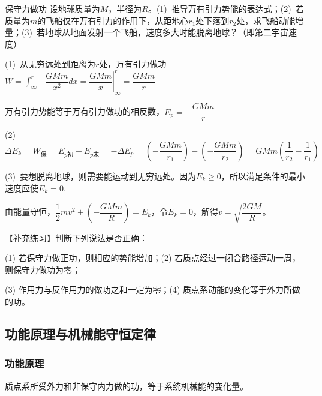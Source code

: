 \begin{example}{保守力做功}
    设地球质量为$M$，半径为$R$。(1)~推导万有引力势能的表达式；(2)~若质量为$m$的飞船仅在万有引力的作用下，从距地心$r_1$处下落到$r_2$处，求飞船动能增量；(3)~若地球从地面发射一个飞船，速度多大时能脱离地球？（即第二宇宙速度）
    
    \tcblower

    (1)~从无穷远处到距离为$r$处，万有引力做功$W=\displaystyle\int_\infty^r{-\dfrac{GMm}{x^2}dx}=\left.\dfrac{GMm}{x}\right|_\infty^r=\dfrac{GMm}{r}$

    \vspace{0.35em}

    万有引力势能等于万有引力做功的相反数，$E_p=-\dfrac{GMm}{r}$

    \vspace{0.35em}
    
    (2)~$\Delta E_k=W_{\text{保}}=E_{p\text{初}}-E_{p\text{末}}=-\Delta E_p=\left(-\dfrac{GMm}{r_1}\right)-\left(-\dfrac{GMm}{r_2}\right)=GMm\left(\dfrac{1}{r_2}-\dfrac{1}{r_1}\right)$

    \vspace{0.35em}

    (3)~要想脱离地球，则需要能运动到无穷远处。因为$E_k\geq 0$，所以满足条件的最小速度应使$E_k=0$.

    \vspace{0.35em}
    
    由能量守恒，$\dfrac{1}{2}mv^2+\left(-\dfrac{GMm}{R}\right)=E_k$，令$E_k=0$，解得$v=\sqrt{\dfrac{2GM}{R}}$。
    
    \tcbline
    【补充练习】判断下列说法是否正确：
    
    (1) 若保守力做正功，则相应的势能增加；(2) 若质点经过一闭合路径运动一周，则保守力做功为零；
    
    (3) 作用力与反作用力的做功之和一定为零；(4) 质点系动能的变化等于外力所做的功。
    
\end{example}

\subsection{功能原理与机械能守恒定律}

\subsubsection{功能原理}

质点系所受外力和非保守内力做的功，等于系统机械能的变化量。

